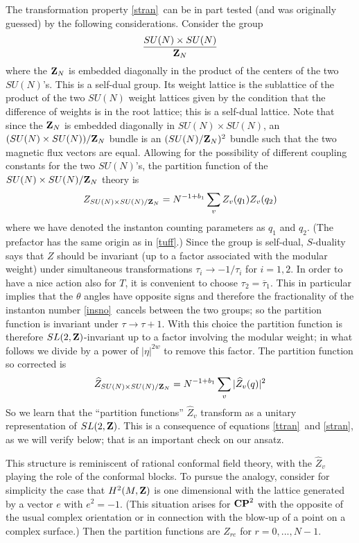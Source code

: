 \documentclass[12pt]{article}
\numberwithin{equation}{section}
\def\bar{\overline}
\begin{document}
The transformation property
\eqref{stran}\ can be in part tested (and was originally guessed) by
the following considerations.
Consider the group
%
$${SU(N)\times SU(N)\over {\bf Z}_N}$$
%
where the ${\bf Z}_N$ is embedded diagonally in the product of the centers
of the two $SU(N)$'s.  This is a self-dual group. Its weight lattice is
the sublattice of the product
of the two $SU(N)$ weight lattices given by the condition
that the difference of weights is in the root lattice;
this is a self-dual lattice.  Note that since
the ${\bf Z}_N$ is embedded diagonally in $SU(N)\times SU(N)$,
an $({SU(N)\times SU(N)})/{\bf Z}_N$ bundle is an $(SU(N)/{\bf Z}_N)^2$ bundle
such that the two magnetic flux vectors are equal.
Allowing for the possibility of different
coupling constants for the two $SU(N)$'s, the partition function of
the $SU(N)\times SU(N)/{\bf Z}_N$ theory is
%
$$Z_{SU(N)\times SU(N)/{\bf Z}_N}=N^{-1+b_1}\sum_v Z_v(q_1)Z_v(q_2)$$
%
where we have denoted the instanton counting parameters as $q_1$ and $q_2$.
(The prefactor has the same origin as in \eqref{tuff}.)
Since the group is self-dual,
$S$-duality says that $Z$ should be invariant (up to
a factor associated with the modular weight)
under simultaneous transformations $\tau_i\to -1/\tau_i$ for $i=1,2$.
In order to
have a nice action also for $T$,
it is convenient to choose $\tau_2=\bar \tau_1$.  This in
particular implies that the $\theta$ angles have opposite
signs and therefore the fractionality of the instanton number
\eqref{insno}\ cancels between the two groups; so the partition
function is invariant under $\tau \rightarrow
\tau+1$.  With this choice
the partition function is therefore $SL(2,{\bf Z})$-invariant up to a factor
involving the modular weight; in what follows we divide by
a power of $|\eta|^{2w}$ to remove this factor.
The partition function so corrected is
%
$$\hat
Z_{SU(N)\times SU(N)/{\bf Z}_N}
=N^{-1+b_1}\sum_{v}|\hat Z_{v}(q)|^2$$
%
So we learn that the ``partition functions'' $\hat Z_v$
transform as a unitary representation of $SL(2,{\bf Z})$.
This is a consequence of equations \eqref{ttran}\ and \eqref{stran}, as we will
verify below; that is an important check on our ansatz.

\bigskip
{}

This structure is reminiscent of rational conformal field theory,
with the $\hat Z_v$ playing the role of the conformal blocks.
To pursue the analogy, consider for simplicity the
case that $H^2(M,{\bf Z})$ is one dimensional with the lattice
generated by a vector $e$ with $e^2=-1$. (This situation arises for
  ${\bf CP}^2$ with the opposite of the usual complex orientation or
in connection with the blow-up of a point on a complex surface.)
Then the
partition functions are
$Z_{re}$ for $r=0,...,N-1$.
\end{document}
